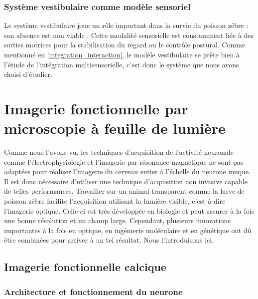 \subsubsection{Système vestibulaire comme modèle sensoriel}

Le système vestibulaire joue un rôle important dans la survie du poisson zèbre : son absence est non viable \cite{riley_development_2000}. Cette modalité sensorielle est constamment liée à des sorties motrices pour la stabilisation du regard ou le contrôle postural. Comme mentionné en \ref{integration_interaction}, le modèle vestibulaire se prête bien à l'étude de l'intégration multisensorielle, c'est donc le système que nous avons choisi d'étudier.


\section[Imagerie fonctionnelle]{Imagerie fonctionnelle par microscopie à feuille de lumière}

Comme nous l'avons vu, les techniques d'acquisition de l'activité neuronale comme l'électrophysiologie et l'imagerie par résonance magnétique ne sont pas adaptées pour réaliser l'imagerie du cerveau entier à l'échelle du neurone unique. Il est donc nécessaire d'utiliser une technique d'acquisition non invasive capable de telles performances. Travailler sur un animal transparent comme la larve de poisson zèbre facilite l'acquisition utilisant la lumière visible, c'est-à-dire l'imagerie optique. Celle-ci est très développée en biologie et peut assurer à la fois une bonne résolution et un champ large. Cependant, plusieurs innovations importantes à la fois en optique, en ingénierie moléculaire et en génétique ont dû être combinées pour arriver à un tel résultat. Nous l'introduisons ici.

\subsection{Imagerie fonctionnelle calcique}

\subsubsection{Architecture et fonctionnement du neurone}

